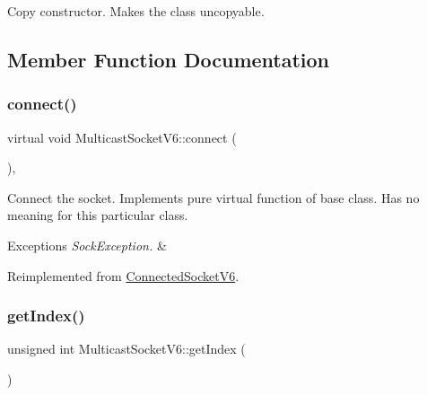 Copy constructor. Makes the class uncopyable. 

\subsection{Member Function Documentation}
\mbox{\label{classMulticastSocketV6_a81b62a13aff687c5b94b8f8a946c58ed}} 
\subsubsection{\texorpdfstring{connect()}{connect()}}
{\footnotesize\ttfamily virtual void Multicast\+Socket\+V6\+::connect (\begin{DoxyParamCaption}{ }\end{DoxyParamCaption})\hspace{0.3cm}{\ttfamily [inline]}, {\ttfamily [virtual]}}

Connect the socket. Implements pure virtual function of base class. Has no meaning for this particular class. 
\begin{DoxyExceptions}{Exceptions}
{\em Sock\+Exception.} & \\
\hline
\end{DoxyExceptions}


Reimplemented from \hyperlink{classConnectedSocketV6_ad08bcbb9f35ac5c5693e352d1bbc5460}{Connected\+Socket\+V6}.

\mbox{\label{classMulticastSocketV6_a6f8366a51c3bb4c9403ec29f84432db0}} 
\subsubsection{\texorpdfstring{get\+Index()}{getIndex()}}
{\footnotesize\ttfamily unsigned int Multicast\+Socket\+V6\+::get\+Index (\begin{DoxyParamCaption}{ }\end{DoxyParamCaption})\hspace{0.3cm}{\ttfamily [inline]}}

\mbox{\label{classMulticastSocketV6_a12383da396c4492f43fc9c0dfeb511b6}} 
